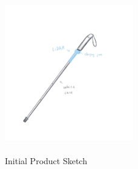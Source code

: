 \documentclass{article}
\begin{document}
\begin{figure}[hp!]
\begin{center}
  \includegraphics[width=0.5\textwidth,height=7cm]{cane2.png}
  \caption{Initial Product Sketch}
  \label{figure 1}
   \end{center}
\end{figure}
\end{document}
